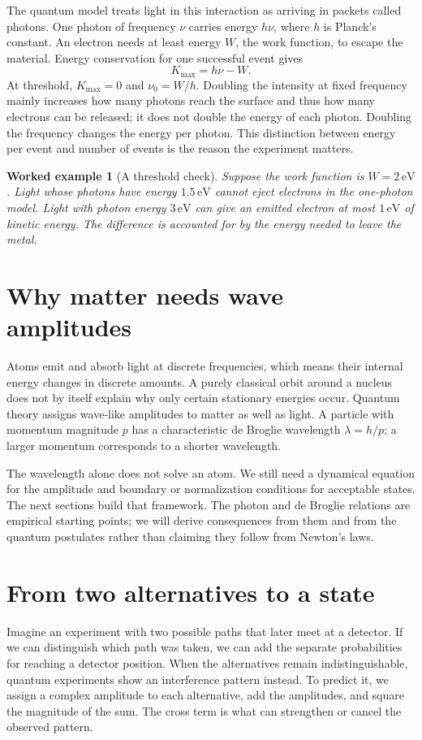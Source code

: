 \documentclass[11pt,oneside]{book}
\theoremstyle{reviewstyle}
\newtheorem{example}{Worked example}[chapter]
\begin{document}
The quantum model treats light in this interaction as arriving in packets called photons. One photon of frequency $\nu$ carries energy $h\nu$, where $h$ is Planck's constant. An electron needs at least energy $W$, the work function, to escape the material. Energy conservation for one successful event gives
\begin{equation}
K_{\max}=h\nu-W.
\end{equation}
At threshold, $K_{\max}=0$ and $\nu_0=W/h$. Doubling the intensity at fixed frequency mainly increases how many photons reach the surface and thus how many electrons can be released; it does not double the energy of each photon. Doubling the frequency changes the energy per photon. This distinction between energy per event and number of events is the reason the experiment matters.

\begin{example}[A threshold check]
Suppose the work function is $W=2\,\mathrm{eV}$. Light whose photons have energy $1.5\,\mathrm{eV}$ cannot eject electrons in the one-photon model. Light with photon energy $3\,\mathrm{eV}$ can give an emitted electron at most $1\,\mathrm{eV}$ of kinetic energy. The difference is accounted for by the energy needed to leave the metal.
\end{example}

\section{Why matter needs wave amplitudes}
Atoms emit and absorb light at discrete frequencies, which means their internal energy changes in discrete amounts. A purely classical orbit around a nucleus does not by itself explain why only certain stationary energies occur. Quantum theory assigns wave-like amplitudes to matter as well as light. A particle with momentum magnitude $p$ has a characteristic de Broglie wavelength $\lambda=h/p$; a larger momentum corresponds to a shorter wavelength.

The wavelength alone does not solve an atom. We still need a dynamical equation for the amplitude and boundary or normalization conditions for acceptable states. The next sections build that framework. The photon and de Broglie relations are empirical starting points; we will derive consequences from them and from the quantum postulates rather than claiming they follow from Newton's laws.

\section{From two alternatives to a state}
Imagine an experiment with two possible paths that later meet at a detector. If we can distinguish which path was taken, we can add the separate probabilities for reaching a detector position. When the alternatives remain indistinguishable, quantum experiments show an interference pattern instead. To predict it, we assign a complex amplitude to each alternative, add the amplitudes, and square the magnitude of the sum. The cross term is what can strengthen or cancel the observed pattern.
\end{document}
